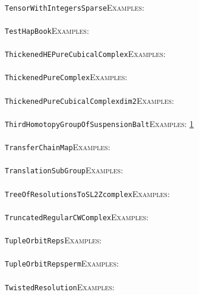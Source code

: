 \documentclass[a4paper,11pt]{report}
\begin{document}
{{ \\
 \texttt{TensorWithIntegersSparse}{\nobreakspace}{\nobreakspace}{\nobreakspace}{\nobreakspace}\textsc{Examples:} \\
 \\
 \texttt{TestHapBook}{\nobreakspace}{\nobreakspace}{\nobreakspace}{\nobreakspace}\textsc{Examples:} \\
 \\
 \texttt{ThickenedHEPureCubicalComplex}{\nobreakspace}{\nobreakspace}{\nobreakspace}{\nobreakspace}\textsc{Examples:} \\
 \\
 \texttt{ThickenedPureComplex}{\nobreakspace}{\nobreakspace}{\nobreakspace}{\nobreakspace}\textsc{Examples:} \\
 \\
 \texttt{ThickenedPureCubicalComplex{\textunderscore}dim2}{\nobreakspace}{\nobreakspace}{\nobreakspace}{\nobreakspace}\textsc{Examples:} \\
 \\
 \texttt{ThirdHomotopyGroupOfSuspensionB{\textunderscore}alt}{\nobreakspace}{\nobreakspace}{\nobreakspace}{\nobreakspace}\textsc{Examples:} \href{../www/SideLinks/About/aboutTensorSquare.html} {1}{\nobreakspace} \\
 \\
 \texttt{TransferChainMap}{\nobreakspace}{\nobreakspace}{\nobreakspace}{\nobreakspace}\textsc{Examples:} \\
 \\
 \texttt{TranslationSubGroup}{\nobreakspace}{\nobreakspace}{\nobreakspace}{\nobreakspace}\textsc{Examples:} \\
 \\
 \texttt{TreeOfResolutionsToSL2Zcomplex}{\nobreakspace}{\nobreakspace}{\nobreakspace}{\nobreakspace}\textsc{Examples:} \\
 \\
 \texttt{TruncatedRegularCWComplex}{\nobreakspace}{\nobreakspace}{\nobreakspace}{\nobreakspace}\textsc{Examples:} \\
 \\
 \texttt{TupleOrbitReps}{\nobreakspace}{\nobreakspace}{\nobreakspace}{\nobreakspace}\textsc{Examples:} \\
 \\
 \texttt{TupleOrbitReps{\textunderscore}perm}{\nobreakspace}{\nobreakspace}{\nobreakspace}{\nobreakspace}\textsc{Examples:} \\
 \\
 \texttt{TwistedResolution}{\nobreakspace}{\nobreakspace}{\nobreakspace}{\nobreakspace}\textsc{Examples:} \\
}}
\end{document}
